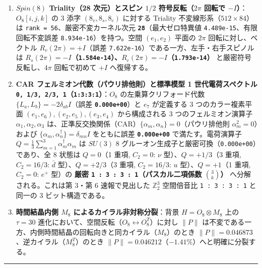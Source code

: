 \documentclass[
  a4paper,
]{ltjsarticle}
\providecommand{\tightlist}{%
  \setlength{\itemsep}{0pt}\setlength{\parskip}{0pt}}
\begin{document}
\begin{enumerate}
\def\labelenumi{\arabic{enumi}.}
\tightlist
\item
  \textbf{\(Spin(8)\) Triality（28 次元）とスピン \(1/2\)
  符号反転（\(2\pi\) 回転で \(-I\)）}：\(O_8[i, j, k]\) の 3 添字
  \((8_v, 8_s, 8_c)\) に対する Triality
  不変線形系（\(512 \times 84\)）は
  \texttt{rank\ =\ 56}、厳密不変カーネル次元
  \textbf{\texttt{28}}（最大ゼロ特異値
  \texttt{4.489e-15}、有限回転不変誤差 \texttt{8.934e-16}）を持つ。空間
  \((e_1, e_2)\) 平面の \(2\pi\) 回転に対し、ベクトル
  \(R_v(2\pi) = +I\)（誤差
  \texttt{7.622e-16}）である一方、左手・右手スピノルは
  \textbf{\(R_s(2\pi) = -I\)（\texttt{1.584e-14}）、\(R_c(2\pi) = -I\)（\texttt{1.793e-14}）}
  と厳密符号反転し、\(4\pi\) 回転で初めて \(+I\) へ復帰する。
\item
  \textbf{CAR フェルミオン代数（パウリ排他則）と標準模型 1
  世代電荷スペクトル
  \texttt{0,\ 1/3,\ 2/3,\ 1}（\texttt{1:3:3:1}）}：\(O_8\)
  の左乗算クリフォード代数 \(\{L_a, L_b\} = -2\delta_{ab}I\)（誤差
  \textbf{\texttt{0.000e+00}}）と \(e_7\) が定義する 3
  つのカラー複素平面 \((e_1,e_6), (e_2,e_5), (e_3,e_4)\) から構成される
  3 つのフェルミオン演算子 \(\alpha_1, \alpha_2, \alpha_3\)
  は、正準反交換関係（CAR）\(\{\alpha_m, \alpha_n\} = 0\)（パウリ排他則
  \(\alpha_m^2 = 0\)）および
  \(\{\alpha_m, \alpha_n^\dagger\} = \delta_{mn}I\) をともに誤差
  \textbf{\texttt{0.000e+00}} で満たす。電荷演算子
  \(Q = \frac{1}{3}\sum_{m=1}^3 \alpha_m^\dagger \alpha_m\) は \(SU(3)\)
  8 グルーオン生成子と厳密可換（\texttt{0.000e+00}）であり、全 8 状態は
  \(Q = 0\)（1 重項, \(C_2=0\): \(\nu\) 型）、\(Q = +1/3\)（3 重項,
  \(C_2=16/3\): \(\bar{d}\) 型）、\(Q = +2/3\)（3 重項, \(C_2=16/3\):
  \(u\) 型）、\(Q = +1\)（1 重項, \(C_2=0\): \(e^+\) 型）の \textbf{厳密
  \texttt{1\ :\ 3\ :\ 3\ :\ 1}（パスカル二項係数 \(\binom{3}{k}\)）}
  へ分解される。これは第 3・第 6 速報で見出した \(\mathbb{Z}_2^3\)
  空間倍音比 \texttt{1\ :\ 3\ :\ 3\ :\ 1} と同一の 3 ビット構造である。
\item
  \textbf{時間結晶内側 \(M_8\) によるカイラル非対称分裂}：背景
  \(H = O_8 \otimes M_8\) 上の \(\tau = 30\)
  進化において、空間反転（\(O_8 \leftrightarrow O_8^T\)）に対し
  \(\|P\|\)
  は不変である一方、内側時間結晶の回転向きと同カイラル（\(M_8\)）のとき
  \(\|P\| = 0.046873\)、逆カイラル（\(M_8^T\)）のとき
  \(\|P\| = 0.046212\)（\(-1.41\%\)）へと明確に分裂する。
\end{enumerate}

\begin{center}\rule{0.5\linewidth}{0.5pt}\end{center}
\end{document}
